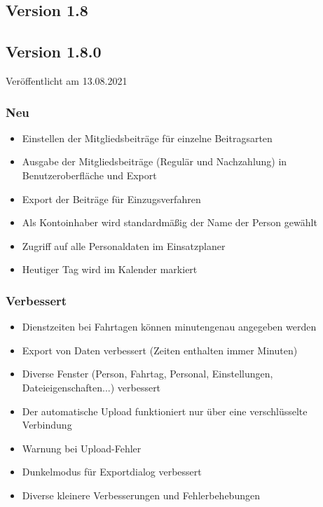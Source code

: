 \begin{neu}
\section{Version 1.8}\label{version:1:8}
\subsection{Version 1.8.0}
\label{version:1:8:0}
Veröffentlicht am 13.08.2021
\subsubsection{Neu}
\begin{itemize}
  \item
  Einstellen der Mitgliedsbeiträge für einzelne Beitragsarten
  \item
  Ausgabe der Mitgliedsbeiträge (Regulär und Nachzahlung) in Benutzeroberfläche und Export
  \item
  Export der Beiträge für Einzugsverfahren
  \item
  Als Kontoinhaber wird standardmäßig der Name der Person gewählt
  \item
  Zugriff auf alle Personaldaten im Einsatzplaner
  \item
  Heutiger Tag wird im Kalender markiert
\end{itemize}

\subsubsection{Verbessert}
\begin{itemize}
  \item
  Dienstzeiten bei Fahrtagen können minutengenau angegeben werden
  \item
  Export von Daten verbessert (Zeiten enthalten immer Minuten)
  \item
  Diverse Fenster (Person, Fahrtag, Personal, Einstellungen, Dateieigenschaften...) verbessert
  \item
  Der automatische Upload funktioniert nur über eine verschlüsselte Verbindung
  \item
  Warnung bei Upload-Fehler
  \item
  Dunkelmodus für Exportdialog verbessert
  \item
  Diverse kleinere Verbesserungen und Fehlerbehebungen

\end{itemize}


\end{neu}
